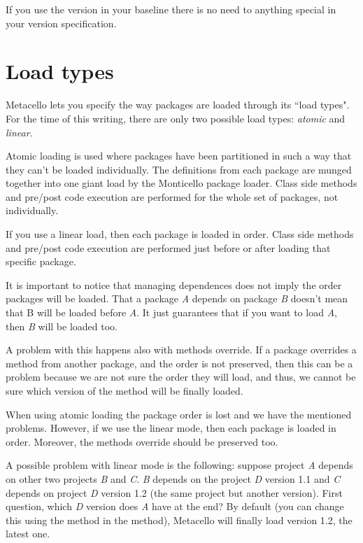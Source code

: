 \documentclass[a4paper,10pt,twoside]{book}
\begin{document}
If you use the  version in your baseline there is no need to anything special in your version specification.




\section{Load types}
Metacello lets you specify the way packages are loaded through its ``load types". For the time of this writing, there are only two possible load types: \emph{atomic} and \emph{linear}.

Atomic loading is used where packages have been partitioned in such a way that they can't be loaded individually. The definitions from each package are munged together into one giant load by the Monticello package loader. Class side  methods and pre/post code execution are performed for the whole set of packages, not individually.

If you use a linear load, then each package is loaded in order. Class side  methods and pre/post code execution are performed just before or after loading that specific package.

It is important to notice that managing dependences does not imply the order packages will be loaded. That a package \emph{A} depends on package \emph{B} doesn't mean that B will be loaded before \emph{A}. It just guarantees that if you want to load \emph{A}, then \emph{B} will be loaded too.

A problem with this happens also with methods override. If a package overrides a method from another package, and the order is not preserved, then this can be a problem because we are not sure the order they will load, and thus, we cannot be sure which version of the method will be finally loaded.

When using atomic loading the package order is lost and we have the mentioned problems. However, if we use the linear mode, then each package is loaded in order. Moreover, the methods override should be preserved too.

A possible problem with linear mode is the following: suppose project \emph{A} depends on other two projects \emph{B} and \emph{C}. \emph{B} depends on the project \emph{D} version 1.1 and \emph{C} depends on project \emph{D} version 1.2 (the same project but another version). First question, which \emph{D} version does \emph{A} have at the end?  By default (you can change this using the method  in the  method), Metacello will finally load version 1.2, \ie the latest one.
\end{document}
